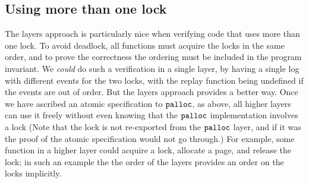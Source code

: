 \subsection{Using more than one lock}

The layers approach is particularly nice when verifying code that uses more than one
lock. To avoid deadlock, all functions must acquire the locks in the
same order, and to prove the correctness the ordering must be
included in the program invariant. We \emph{could} do such a
verification in a single layer, by having a single log with different
events for the two locks, with the replay function being undefined if
the events are out of order. But the layers approach provides a
better way. Once we have ascribed an atomic specification to
${\mathrm{\texttt{palloc}}}$, as above, all higher layers can use it
freely without even knowing that the ${\mathrm{\texttt{palloc}}}$ implementation
involves a lock (Note that the lock is not re-exported from the
${\mathrm{\texttt{palloc}}}$ layer, and if it was the proof of the atomic
specification would not go through.)  For example, some function in a
higher layer could acquire a lock, allocate a page, and release the
lock; in such an example the the order of the layers provides an order
on the locks implicitly.




